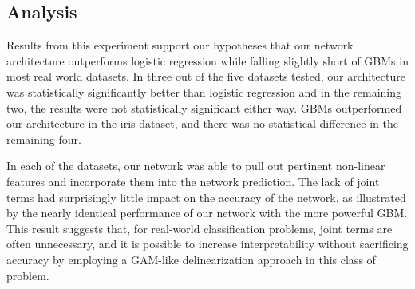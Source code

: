     
    
    

    


\subsection{Analysis}

Results from this experiment support our hypotheses that our network architecture outperforms logistic regression while falling slightly short of GBMs in most real world datasets. In three out of the five datasets tested, our architecture was statistically significantly better than logistic regression and in the remaining two, the results were not statistically significant either way. GBMs outperformed our architecture in the iris dataset, and there was no statistical difference in the remaining four.  

In each of the datasets, our network was able to pull out pertinent non-linear features and incorporate them into the network prediction. The lack of joint terms had surprisingly little impact on the accuracy of the network, as illustrated by the nearly identical performance of our network with the more powerful GBM. This result suggests that, for real-world classification problems, joint terms are often unnecessary, and it is possible to increase interpretability without sacrificing accuracy by employing a GAM-like delinearization approach in this class of problem. 

